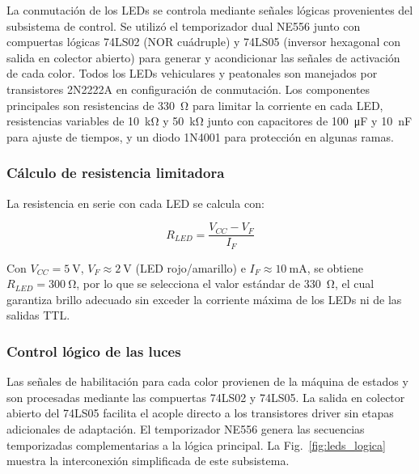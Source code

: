 \documentclass[10pt,onecolumn]{IEEEtran}
\begin{document}
La conmutación de los LEDs se controla mediante señales lógicas provenientes del subsistema de control. Se utilizó el temporizador dual NE556 junto con compuertas lógicas 74LS02 (NOR cuádruple) y 74LS05 (inversor hexagonal con salida en colector abierto) para generar y acondicionar las señales de activación de cada color. Todos los LEDs vehiculares y peatonales son manejados por transistores 2N2222A en configuración de conmutación. Los componentes principales son resistencias de \SI{330}{\ohm} para limitar la corriente en cada LED, resistencias variables de \SI{10}{\kilo\ohm} y \SI{50}{\kilo\ohm} junto con capacitores de \SI{100}{\micro\farad} y \SI{10}{\nano\farad} para ajuste de tiempos, y un diodo 1N4001 para protección en algunas ramas.

\subsubsection{Cálculo de resistencia limitadora}

La resistencia en serie con cada LED se calcula con:

\begin{equation}
R_{LED} = \frac{V_{CC} - V_F}{I_F}
\end{equation}

Con $V_{CC} = \SI{5}{\volt}$, $V_F \approx \SI{2}{\volt}$ (LED rojo/amarillo) e $I_F \approx \SI{10}{\milli\ampere}$, se obtiene $R_{LED} = \SI{300}{\ohm}$, por lo que se selecciona el valor estándar de \SI{330}{\ohm}, el cual garantiza brillo adecuado sin exceder la corriente máxima de los LEDs ni de las salidas TTL.

\subsubsection{Control lógico de las luces}

Las señales de habilitación para cada color provienen de la máquina de estados y son procesadas mediante las compuertas 74LS02 y 74LS05. La salida en colector abierto del 74LS05 facilita el acople directo a los transistores driver sin etapas adicionales de adaptación. El temporizador NE556 genera las secuencias temporizadas complementarias a la lógica principal. La Fig.~\ref{fig:leds_logica} muestra la interconexión simplificada de este subsistema.
\end{document}
